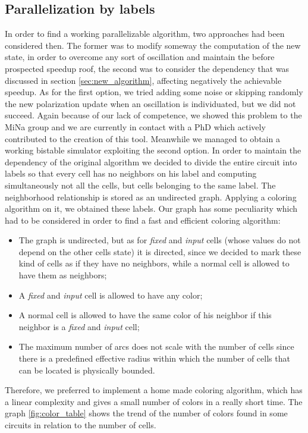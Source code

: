 \subsection{Parallelization by labels}
In order to find a working parallelizable algorithm, two approaches had been considered then. The former was to modify someway the computation of the new state, in order to overcome any sort of oscillation and maintain the before prospected speedup roof, the second was to consider the dependency that was discussed in section \ref{sec:new_algorithm}, affecting negatively the achievable speedup.
As for the first option, we tried adding some noise or skipping randomly the new polarization update when an oscillation is individuated, but we did not succeed. Again because of our lack of competence, we showed this problem to the MiNa group and we are currently in contact with a PhD which actively contributed to the creation of this tool. Meanwhile we managed to obtain a working bistable simulator exploiting the second option.\newline
In order to maintain the dependency of the original algorithm we decided to divide the entire circuit into labels so that every cell has no neighbors on his label and computing simultaneously not all the cells, but cells belonging to the same label.
The neighborhood relationship is stored as an undirected graph. Applying a coloring algorithm on it, we obtained these labels. Our graph has some peculiarity which had to be considered in order to find a fast and efficient coloring algorithm:
\begin{itemize}
	\item The graph is undirected, but as for \textit{fixed} and \textit{input} cells (whose values do not depend on the other cells state) it is directed, since we decided to mark these kind of cells as if they have no neighbors, while a normal cell is allowed to have them as neighbors;
	\item A \textit{fixed} and \textit{input} cell is allowed to have any color;
	\item A normal cell is allowed to have the same color of his neighbor if this neighbor is a \textit{fixed} and \textit{input} cell;
	\item The maximum number of arcs does not scale with the number of cells since there is a predefined effective radius within which the number of cells that can be located is physically bounded.
\end{itemize}
Therefore, we preferred to implement a home made coloring algorithm, which has a linear complexity and gives a small number of colors in a really short time. The graph \ref{fig:color_table} shows the trend of the number of colors found in some circuits in relation to the number of cells.
